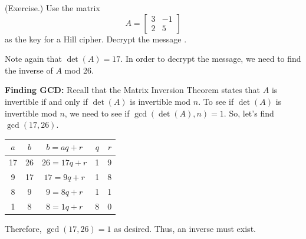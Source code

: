 \documentclass[letterpaper]{article}
\begin{document}
\begin{mdframed}
    (Exercise.) Use the matrix \[A = \begin{bmatrix}
        3 & -1 \\ 2 & 5
    \end{bmatrix}\] as the key for a Hill cipher. Decrypt the message .

    \begin{mdframed}
        Note again that $\det(A) = 17$. In order to decrypt the message, we need to find the inverse of $A$ mod 26.

        \bigskip 

        \textbf{Finding GCD:} Recall that the Matrix Inversion Theorem states that $A$ is invertible if and only if $\det(A)$ is invertible mod $n$. To see if $\det(A)$ is invertible mod $n$, we need to see if $\gcd(\det(A), n) = 1$. So, let's find $\gcd(17, 26)$.  
        \begin{center}
            \begin{tabular}{c|c|c|c|c}
                $a$ & $b$ & $b = aq + r$ & $q$ & $r$ \\ 
                \hline 
                17 & 26 & $26 = 17q + r$ & 1 & 9 \\ 
                9 & 17 & $17 = 9q + r$ & 1 & 8 \\ 
                8 & 9 & $9 = 8q + r$ & 1 & 1 \\ 
                1 & 8 & $8 = 1q + r$ & 8 & 0
            \end{tabular}
        \end{center}
        Therefore, $\gcd(17, 26) = 1$ as desired. Thus, an inverse must exist. 

        \bigskip 
        

\end{mdframed}
\end{mdframed}
\end{document}
